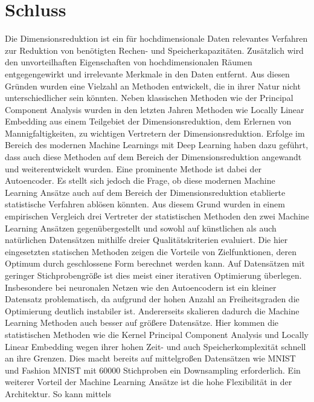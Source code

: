 \chapter{Schluss}
\label{ch:Schluss}

Die Dimensionsreduktion ist ein für hochdimensionale Daten relevantes Verfahren zur Reduktion von
benötigten Rechen- und Speicherkapazitäten. Zusätzlich wird den unvorteilhaften Eigenschaften von
hochdimensionalen Räumen entgegengewirkt und irrelevante Merkmale in den Daten entfernt. Aus diesen
Gründen wurden eine Vielzahl an Methoden entwickelt, die in ihrer Natur nicht unterschiedlicher
sein könnten. Neben klassischen Methoden wie der Principal Component Analysis wurden in den letzten
Jahren Methoden wie Locally Linear Embedding aus einem Teilgebiet der Dimensionsreduktion, dem
Erlernen von Mannigfaltigkeiten, zu wichtigen Vertretern der Dimensionsreduktion. Erfolge im
Bereich des modernen Machine Learnings mit Deep Learning haben dazu geführt, dass auch diese
Methoden auf dem Bereich der Dimensionsreduktion angewandt und weiterentwickelt wurden. Eine
prominente Methode ist dabei der Autoencoder. Es stellt sich jedoch die Frage, ob diese modernen
Machine Learning Ansätze auch auf dem Bereich der Dimensionsreduktion etablierte statistische
Verfahren ablösen könnten. Aus diesem Grund wurden in einem empirischen Vergleich drei Vertreter
der statistischen Methoden den zwei Machine Learning Ansätzen gegenübergestellt und sowohl auf
künstlichen als auch natürlichen Datensätzen mithilfe dreier Qualitätskriterien evaluiert. Die hier
eingesetzten statischen Methoden zeigen die Vorteile von Zielfunktionen, deren Optimum durch
geschlossene Form berechnet werden kann. Auf Datensätzen mit geringer Stichprobengröße ist dies
meist einer iterativen Optimierung überlegen. Insbesondere bei neuronalen Netzen wie den
Autoencodern ist ein kleiner Datensatz problematisch, da aufgrund der hohen Anzahl an
Freiheitsgraden die Optimierung deutlich instabiler ist. Andererseits skalieren dadurch die Machine
Learning Methoden auch besser auf größere Datensätze. Hier kommen die statistischen Methoden wie
die Kernel Principal Component Analysis und Locally Linear Embedding wegen ihrer hohen Zeit- und
auch Speicherkomplexität schnell an ihre Grenzen. Dies macht bereits auf mittelgroßen Datensätzen
wie MNIST und Fashion MNIST mit \num{60000} Stichproben ein Downsampling erforderlich. Ein weiterer
Vorteil der Machine Learning Ansätze ist die hohe Flexibilität in der Architektur. So kann mittels
